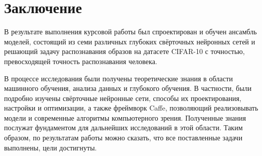 \section{Заключение}
В результате выполнения курсовой работы был спроектирован и обучен ансамбль моделей,
состоящий из семи различных глубоких свёрточных нейронных сетей и решающий задачу распознавания
образов на датасете CIFAR-10 с точностью, превосходящей точность распознавания человека.

В процессе исследования были получены теоретические знания в области машинного обучения,
анализа данных и глубокого обучения. В частности, были подробно изучены свёрточные нейронные 
сети, способы их проектирования, настройки и оптимизации, а также фреймворк Caffe, позволяющий
реализовывать модели и современные алгоритмы компьютерного зрения. Полученные знания послужат 
фундаментом для дальнейших исследований в этой области. Таким образом, по результатам работы можно 
сказать, что все поставленные задачи выполнены, цели достигнуты.


